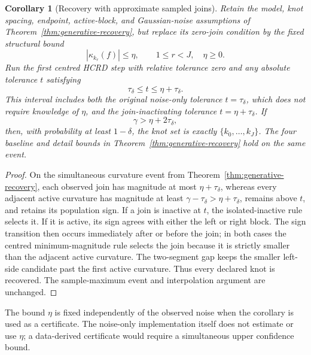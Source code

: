 \documentclass[review,onefignum,onetabnum]{siamonline250211}
\newtheorem{corollary}{Corollary}
\begin{document}
\begin{corollary}[Recovery with approximate sampled joins]
\label{cor:approximate-joins}
Retain the model, knot spacing, endpoint, active-block, and Gaussian-noise
assumptions of Theorem~\ref{thm:generative-recovery}, but replace its zero-join
condition by the fixed structural bound
\begin{equation}
 |\kappa_{k_r}(f)|\le\eta,\qquad 1\le r<J,
 \quad \eta\ge0.
\end{equation}
Run the first centred HCRD step with relative tolerance zero and any absolute
tolerance $t$ satisfying
\begin{equation}
 \tau_\delta\le t\le\eta+\tau_\delta.
\end{equation}
This interval includes both the original noise-only tolerance
$t=\tau_\delta$, which does not require knowledge of $\eta$, and the
join-inactivating tolerance $t=\eta+\tau_\delta$.
If
\begin{equation}
 \gamma>\eta+2\tau_\delta,
\end{equation}
then, with probability at least $1-\delta$, the knot set is exactly
$\{k_0,\ldots,k_J\}$.  The four baseline and detail bounds in
Theorem~\ref{thm:generative-recovery} hold on the same event.
\end{corollary}
\begin{proof}
On the simultaneous curvature event from
Theorem~\ref{thm:generative-recovery}, each observed join has magnitude at
most $\eta+\tau_\delta$, whereas every adjacent active curvature has magnitude
at least $\gamma-\tau_\delta>\eta+\tau_\delta$, remains above $t$, and retains
its population sign.  If a join is inactive at $t$, the isolated-inactive rule
selects it.  If it is active, its sign agrees with either the left or right
block.  The sign transition then occurs immediately after or before the join;
in both cases the centred minimum-magnitude rule selects the join because it
is strictly smaller than the adjacent active curvature.  The two-segment gap
keeps the smaller left-side candidate past the first active curvature.  Thus
every declared knot is recovered.  The sample-maximum event and interpolation
argument are unchanged.
\end{proof}

The bound $\eta$ is fixed independently of the observed noise when the
corollary is used as a certificate.  The noise-only implementation itself does
not estimate or use $\eta$; a data-derived certificate would require a
simultaneous upper confidence bound.
\end{document}
